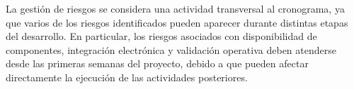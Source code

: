 La gestión de riesgos se considera una actividad transversal al cronograma, ya
que varios de los riesgos identificados pueden aparecer durante distintas etapas
del desarrollo. En particular, los riesgos asociados con disponibilidad de
componentes, integración electrónica y validación operativa deben atenderse
desde las primeras semanas del proyecto, debido a que pueden afectar directamente
la ejecución de las actividades posteriores.
